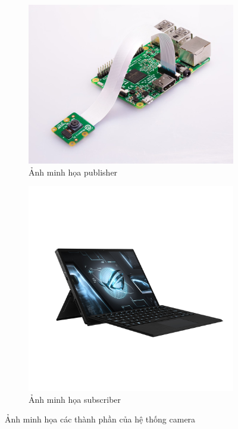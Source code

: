 \documentclass{article}
\begin{document}
\begin{figure}[H]
\centering
\begin{subfigure}[b]{0.4\textwidth}
\centering
\includegraphics[width=\textwidth]{pi-camera-attached.jpg}
\caption{Ảnh minh họa publisher}
\label{pi_sys}
\end{subfigure}
\hfill
\begin{subfigure}[b]{0.4\textwidth}
\centering
\includegraphics[width=\textwidth]{laptop.jpg}
    \caption{Ảnh minh họa subscriber}
    \label{laptop}
\end{subfigure}
\caption{Ảnh minh họa các thành phần của hệ thống camera}
\label{fig:three graphs}
\end{figure}
\end{document}
